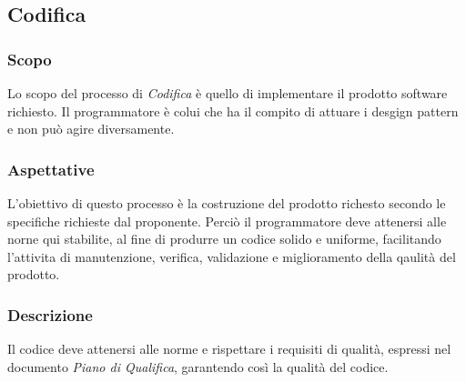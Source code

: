 	\subsection{Codifica}
		\subsubsection{Scopo}
		Lo scopo del processo di \textit{Codifica} è quello di implementare il prodotto software richiesto. Il programmatore è colui che ha il compito di attuare i desgign pattern e non può agire diversamente.
		\subsubsection{Aspettative}
		L'obiettivo di questo processo è la costruzione del prodotto richesto secondo le specifiche richieste dal proponente. Perciò il programmatore deve attenersi alle norne qui stabilite, al fine di produrre un codice solido e uniforme, facilitando l'attivita di manutenzione, verifica, validazione e miglioramento della qaulità del prodotto.
		\subsubsection{Descrizione}
		Il codice deve attenersi alle norme e rispettare i requisiti di qualità, espressi nel documento \textit{Piano di Qualifica}, garantendo così la qualità del codice.
